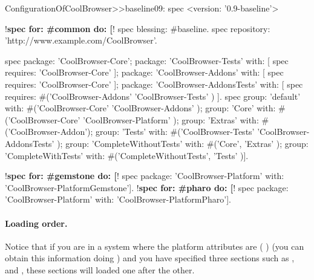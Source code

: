 \documentclass[a4paper,10pt,twoside]{book}
\begin{document}
\begin{code}{}
ConfigurationOfCoolBrowser>>baseline09: spec
      <version: '0.9-baseline'>

      !\textbf{spec for: \#common do: [}!
            spec blessing: #baseline.
            spec repository: 'http://www.example.com/CoolBrowser'.

            spec
                  package: 'CoolBrowser-Core';
                  package: 'CoolBrowser-Tests' with: [ spec requires: 'CoolBrowser-Core' ];
                  package: 'CoolBrowser-Addons' with: [ spec requires: 'CoolBrowser-Core' ];
                  package: 'CoolBrowser-AddonsTests' with: [
                        spec requires: #('CoolBrowser-Addons' 'CoolBrowser-Tests' ) ].
            spec
                  group: 'default' with: #('CoolBrowser-Core' 'CoolBrowser-Addons' );
                  group: 'Core' with: #('CoolBrowser-Core' 'CoolBrowser-Platform' );
                  group: 'Extras' with: #('CoolBrowser-Addon');
                  group: 'Tests' with: #('CoolBrowser-Tests' 'CoolBrowser-AddonsTests' );
                  group: 'CompleteWithoutTests' with: #('Core', 'Extras' );
                  group: 'CompleteWithTests' with: #('CompleteWithoutTests', 'Tests' )].

      !\textbf{spec for: \#gemstone do: [}!
            spec package: 'CoolBrowser-Platform' with: 'CoolBrowser-PlatformGemstone'].
      !\textbf{spec for: \#pharo do: [}!
            spec package: 'CoolBrowser-Platform' with: 'CoolBrowser-PlatformPharo'].
\end{code}



\paragraph{Loading order.}
Notice that if you are
in a system where the platform attributes are (    ) (you can obtain this information doing ) and you have specified three sections such as ,  and , these sections will loaded one after the other.
\end{document}
